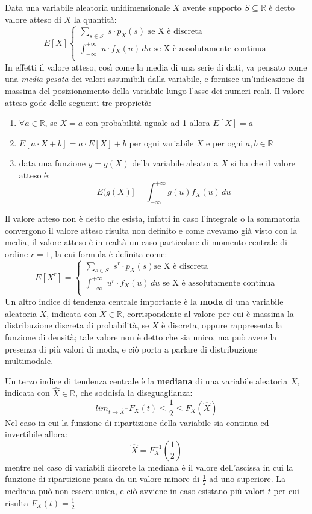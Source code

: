 \documentclass[a4paper,12pt, oneside]{book}
\newcommand{\numberset}{\mathbb}
\newcommand{\R}{\numberset{R}}
\begin{document}
Data una variabile aleatoria unidimensionale $X$ avente supporto $S \subseteq \R$ è detto valore atteso di $X$ la quantità:
\[E[X]\begin{cases}
    \sum_{s\in S}\,\, s\cdot p_X(s)\mbox{ se X è discreta}\\
    \int_{-\infty}^{+\infty}\,\, u\cdot f_X(u)\,du\mbox{ se X è assolutamente continua}\\
\end{cases}\]
In effetti il valore atteso, così come la media di una serie di dati, va pensato come una \textit{media pesata}
dei valori assumibili dalla variabile, e fornisce un'indicazione di massima del posizionamento della variabile
lungo l'asse dei numeri reali.\newline
Il valore atteso gode delle seguenti tre proprietà:
\begin{enumerate}
    \item $\forall a \in \R$, se $X = a$ con probabilità uguale ad 1 allora $E[X] = a$
    \item $E[a\cdot X + b] = a\cdot E[X] + b$ per ogni variabile $X$ e per ogni $a, b \in \R$
    \item data una funzione $y = g(X)$ della variabile aleatoria $X$ si ha che il valore atteso è:
            \[E(g(X)]=\int_{-\infty}^{+\infty}g(u)f_X(u)\,du\]
\end{enumerate}
Il valore atteso non è detto che esista, infatti in caso l'integrale o la sommatoria convergono il valore
atteso risulta non definito e come avevamo già visto con la media, il valore atteso è in realtà un caso
particolare di momento centrale di ordine $r = 1$, la cui formula è definita come:
\[ E[X^r] = \begin{cases}
    \sum _{s \in S} \,\, s^r \cdot p_X(s) \mbox{se X è discreta}\\
    \int_{-\infty}^{+\infty}\,\, u^r\cdot f_X(u)\,du\mbox{ se X è assolutamente continua}\\
\end{cases}\]
Un altro indice di tendenza centrale importante è la \textbf{moda} di una variabile aleatoria $X$, indicata
con $\widetilde{X} \in \R$, corrispondente al valore per cui è massima la distribuzione discreta di
probabilità, se $X$ è discreta, oppure rappresenta la funzione di densità; tale valore non è detto che sia
unico, ma può avere la presenza di più valori di moda, e ciò porta a parlare di distribuzione multimodale.

Un terzo indice di tendenza centrale è la \textbf{mediana}  di una variabile aleatoria $X$, 
indicata con $\hat{X} \in \R$, che soddisfa la diseguaglianza:
\[lim_{t \to \hat{X}^-} F_X(t) \leq \frac{1}{2} \leq F_X(\hat{X})\]
Nel caso in cui la funzione di ripartizione della variabile sia continua ed invertibile allora:
\[\hat{X}=F_X^{-1}(\frac{1}{2})\] 
mentre nel caso di variabili discrete la mediana è il valore dell'ascissa in cui la funzione di ripartizione
passa da un valore minore di $\frac{1}{2}$ ad uno superiore.
La mediana può non essere unica, e ciò avviene in caso esistano più valori $t$ per cui risulta $F_X(t) = \frac{1}{2}$
\end{document}
